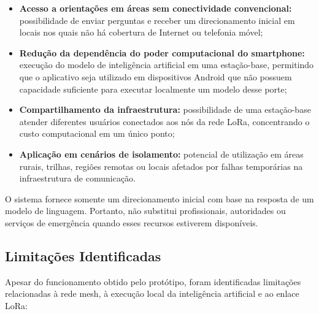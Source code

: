 \documentclass[12pt]{article}
\begin{document}
\begin{itemize}
    \item \textbf{Acesso a orientações em áreas sem conectividade convencional:} possibilidade de enviar perguntas e receber um direcionamento inicial em locais nos quais não há cobertura de Internet ou telefonia móvel;

    \item \textbf{Redução da dependência do poder computacional do smartphone:} execução do modelo de inteligência artificial em uma estação-base, permitindo que o aplicativo seja utilizado em dispositivos Android que não possuem capacidade suficiente para executar localmente um modelo desse porte;

    \item \textbf{Compartilhamento da infraestrutura:} possibilidade de uma estação-base atender diferentes usuários conectados aos nós da rede LoRa, concentrando o custo computacional em um único ponto;

    \item \textbf{Aplicação em cenários de isolamento:} potencial de utilização em áreas rurais, trilhas, regiões remotas ou locais afetados por falhas temporárias na infraestrutura de comunicação.
\end{itemize}

O sistema fornece somente um direcionamento inicial com base na resposta de um modelo de linguagem. Portanto, não substitui profissionais, autoridades ou serviços de emergência quando esses recursos estiverem disponíveis.

\subsection{Limitações Identificadas}

Apesar do funcionamento obtido pelo protótipo, foram identificadas limitações relacionadas à rede mesh, à execução local da inteligência artificial e ao enlace LoRa:
\end{document}
